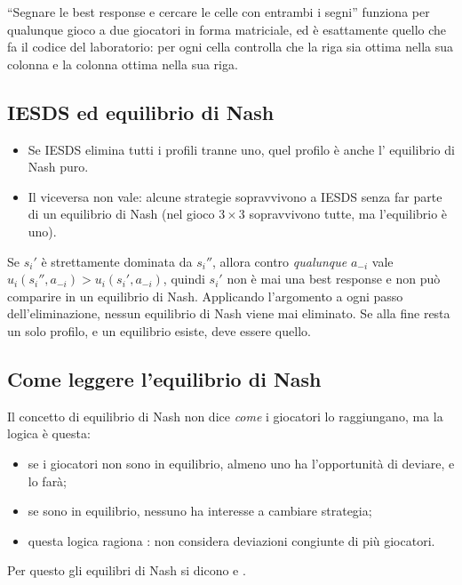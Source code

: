 \begin{osservazione}
``Segnare le best response e cercare le celle con entrambi i segni'' funziona per qualunque
gioco a due giocatori in forma matriciale, ed è esattamente quello che fa il codice del
laboratorio: per ogni cella controlla che la riga sia ottima nella sua colonna e la colonna
ottima nella sua riga.
\end{osservazione}

\subsection{IESDS ed equilibrio di Nash}
\begin{itemize}
  \item Se IESDS elimina tutti i profili tranne uno, quel profilo è anche l'
        equilibrio di Nash puro.
  \item Il viceversa non vale: alcune strategie sopravvivono a IESDS senza far parte di un
        equilibrio di Nash (nel gioco $3\times3$ sopravvivono tutte, ma l'equilibrio è uno).
\end{itemize}

\begin{extra}
Se $s_i'$ è strettamente dominata da $s_i''$, allora contro \emph{qualunque} $a_{-i}$ vale
$u_i(s_i'', a_{-i}) > u_i(s_i', a_{-i})$, quindi $s_i'$ non è mai una best response e non
può comparire in un equilibrio di Nash. Applicando l'argomento a ogni passo
dell'eliminazione, nessun equilibrio di Nash viene mai eliminato. Se alla fine resta un
solo profilo, e un equilibrio esiste, deve essere quello.
\end{extra}

\subsection{Come leggere l'equilibrio di Nash}

Il concetto di equilibrio di Nash non dice \emph{come} i giocatori lo raggiungano, ma la
logica è questa:
\begin{itemize}
  \item se i giocatori non sono in equilibrio, almeno uno ha l'opportunità di deviare, e lo
        farà;
  \item se sono in equilibrio, nessuno ha interesse a cambiare strategia;
  \item questa logica ragiona : non considera deviazioni
        congiunte di più giocatori.
\end{itemize}
Per questo gli equilibri di Nash si dicono  e .

